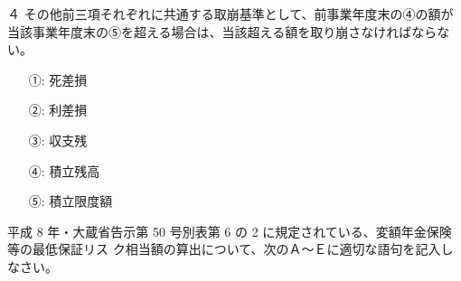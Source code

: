 \documentclass[report,gutter=10mm,fore-edge=10mm,uplatex,dvipdfmx]{jlreq}
\begin{document}
４ その他前三項それぞれに共通する取崩基準として、前事業年度末の④の額が当該事業年度末の⑤を超える場合は、当該超える額を取り崩さなければならない。

\answer{}
\begin{itemize}
\item[ ①: ] 死差損
\item[ ②: ] 利差損
\item[ ③: ] 収支残
\item[ ④: ] 積立残高
\item[ ⑤: ] 積立限度額
\end{itemize}

平成 8 年・大蔵省告示第 50 号別表第 6 の 2 に規定されている、変額年金保険等の最低保証リス
ク相当額の算出について、次のＡ～Ｅに適切な語句を記入しなさい。
\end{document}
